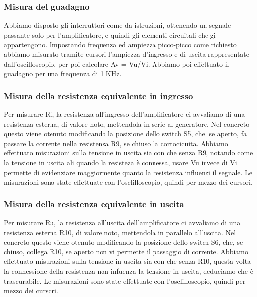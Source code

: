 \documentclass[a4paper]{article}
\begin{document}
			\subsubsection{Misura del guadagno}
				Abbiamo disposto gli interruttori come da istruzioni, ottenendo un segnale passante solo per l'amplificatore, e quindi gli elementi circuitali che gi appartengono. %
				Impostando frequenza ed ampiezza picco-picco come richiesto abbiamo misurato tramite cursori l'ampiezza d'ingresso e di uscita rappresentate dall'oscilloscopio, per poi calcolare Av = Vu/Vi.
				Abbiamo poi effettuato il guadagno per una frequenza di 1 KHz.
			\subsubsection{Misura della resistenza equivalente in ingresso}	
				Per misurare Ri, la resistenza all'ingresso dell'amplificatore ci avvaliamo di una resistenza esterna, di valore noto, mettendola in serie al generatore.
				Nel concreto questo viene otenuto modificando la  posizione dello switch S5, che, se aperto, fa passare la corrente nella resistenza R9, se chiuso la cortocicuita.
				Abbiamo effettuato misurazioni sulla tensione in uscita sia con che senza R9, notando come la tensione in uscita ali quando la resisteza è connessa, usare Vu invece di Vi permette di evidenziare maggiormente quanto la resistenza influenzi il segnale. %
				Le misurazioni sono state effettuate con l'osclilloscopio, quindi per mezzo dei cursori.
			\subsubsection{Misura della resistenza equivalente in uscita}	
				Per misurare Ru, la resistenza all'uscita dell'amplificatore ci avvaliamo di una resistenza esterna R10, di valore noto, mettendola in parallelo all'uscita.
				Nel concreto questo viene otenuto modificando la  posizione dello switch S6, che, se chiuso, collega R10, se aperto non vi permette il passaggio di corrente.
				Abbiamo effettuato misurazioni sulla tensione in uscita sia con che senza R10, questa volta la connessione della resistenza non infuenza la tensione in uscita, deduciamo che è trascurabile. %
				Le misurazioni sono state effettuate con l'osclilloscopio, quindi per mezzo dei cursori.
\end{document}
